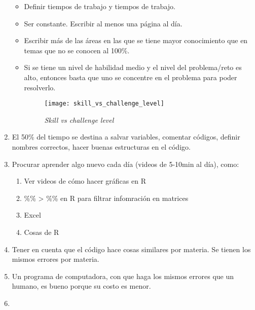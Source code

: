 \begin{appendices}
\begin{enumerate}
  \begin{itemize}
    \item Definir tiempos de trabajo y tiempos de trabajo.
  
  \item Ser constante. Escribir al menos una página al día.
  
  \item Escribir más de las áreas en las que se tiene mayor conocimiento que en temas que no se conocen al 100\%.
  
  \item Si se tiene un nivel de habilidad medio y el nivel del problema/reto es alto, entonces basta que uno se concentre en el problema para poder resolverlo.
  
\begin{figure}[H]
\centering
\texttt{[image: skill\_vs\_challenge\_level]} %
\caption{\textit{Skill vs challenge level}}
\end{figure}  
  
  \end{itemize}
  

  
  \item El 50\% del tiempo se destina a salvar variables, comentar códigos, definir nombres correctos, hacer buenas estructuras en el código.
  
  \item Procurar aprender algo nuevo cada día (videos de 5-10min al día), como:

\begin{enumerate}
\item Ver videos de cómo hacer gráficas en R

\item \%\% > \%\% en R para filtrar infomración en matrices

\item Excel

\item Cosas de R
\end{enumerate}
  
  \item Tener en cuenta que el código hace cosas similares por materia. Se tienen los mismos errores por materia.
  
  \item Un programa de computadora, con que haga los mismos errores que un humano, es bueno porque su costo es menor.
  
  \item 
  

\end{enumerate}
\end{appendices}
